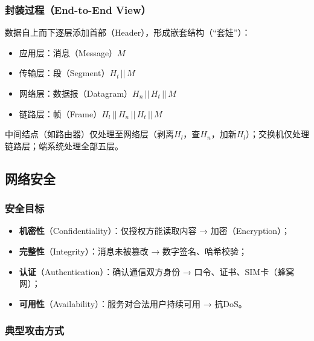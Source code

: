 \subsubsection{封装过程（End-to-End View）}

数据自上而下逐层添加首部（Header），形成嵌套结构（“套娃”）：
\begin{itemize}
    \item 应用层：消息（Message）$M$
    \item 传输层：段（Segment）$H_t\,||\,M$
    \item 网络层：数据报（Datagram）$H_n\,||\,H_t\,||\,M$
    \item 链路层：帧（Frame）$H_l\,||\,H_n\,||\,H_t\,||\,M$
\end{itemize}

中间结点（如路由器）仅处理至网络层（剥离$H_l$，查$H_n$，加新$H_l$）；交换机仅处理链路层；端系统处理全部五层。

\subsection{网络安全}

\subsubsection{安全目标}

\begin{itemize}
    \item \textbf{机密性}（Confidentiality）：仅授权方能读取内容 → 加密（Encryption）；
    \item \textbf{完整性}（Integrity）：消息未被篡改 → 数字签名、哈希校验；
    \item \textbf{认证}（Authentication）：确认通信双方身份 → 口令、证书、SIM卡（蜂窝网）；
    \item \textbf{可用性}（Availability）：服务对合法用户持续可用 → 抗DoS。
\end{itemize}

\subsubsection{典型攻击方式}

